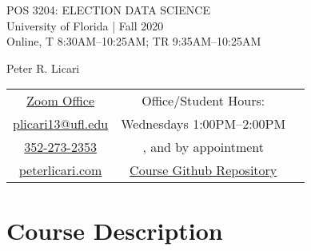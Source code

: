 \documentclass[11pt]{article}
\begin{document}
\begin{center}
{\Huge POS 3204: ELECTION DATA SCIENCE}\\\vspace{1mm}
{\Large University of Florida | Fall 2020}\\\vspace{1mm}
{\Large Online, T 8:30AM--10:25AM; TR 9:35AM--10:25AM}
\end{center}
\bigskip
\begin{center}
{\LARGE Peter R. Licari}\\\vspace{5mm}
\setlength{\tabcolsep}{20pt}
\begin{tabular}{ c c c}
  {\href{https://ufl.zoom.us/j/8174990226}{Zoom Office}} & Office/Student Hours:\\
    {\href{mailto:plicari13@ufl.edu}{plicari13@ufl.edu}} & Wednesdays 1:00PM--2:00PM \\
  {\href{tel:3522732353}{352-273-2353}} & , and by appointment \\
  {\href{https://www.peterlicari.com}{peterlicari.com}} & \href{https://github.com/prlitics/Election-Data-Science-Fall-2020}{Course Github Repository}
\end{tabular}
\end{center}

\section{Course Description} 
\end{document}
